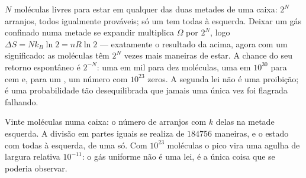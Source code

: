 \begin{example}\label{ex:b1:second-law-entropy:count}
$N$ moléculas livres para estar em qualquer das duas metades de uma caixa:
$2^N$ arranjos, todos igualmente prováveis; só um tem todas à esquerda.
Deixar um gás confinado numa metade se expandir multiplica $\Omega$ por $2^N$, logo $\Delta S =
Nk_B\ln2 = nR\ln2$ --- exatamente o resultado da  acima,
agora com um significado: as moléculas têm $2^N$ vezes mais maneiras de
estar. A chance do seu retorno espontâneo é $2^{-N}$: uma em mil para dez
moléculas, uma em $10^{30}$ para cem e, para um , um número com
$10^{23}$ zeros. A segunda lei não é uma proibição; é uma probabilidade tão
desequilibrada que jamais uma única vez foi flagrada falhando.
\end{example}

\begin{omfigure}

{\small Vinte moléculas numa caixa: o número de arranjos com $k$ delas na
metade esquerda. A divisão em partes iguais se realiza de $184756$ maneiras, e o
estado com todas à esquerda, de uma só. Com $10^{23}$ moléculas o pico vira
uma agulha de largura relativa $10^{-11}$: o gás uniforme não é uma lei, é a
única coisa que se poderia observar.}
\end{omfigure}

